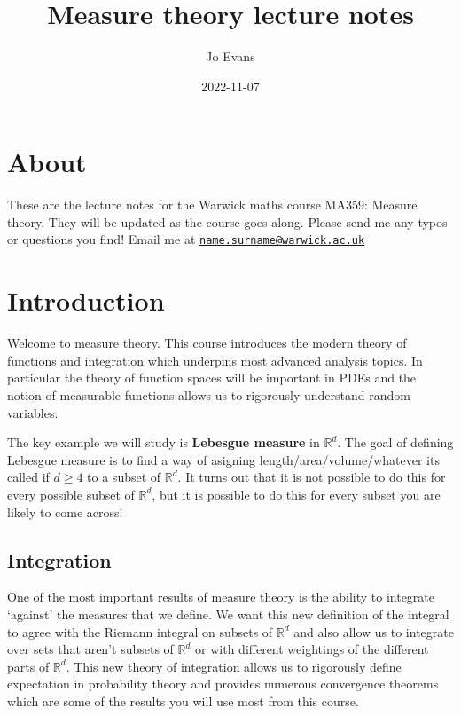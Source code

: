 \documentclass[
]{book}
\title{Measure theory lecture notes}
\author{Jo Evans}
\date{2022-11-07}
\theoremstyle{definition}
\theoremstyle{definition}
\theoremstyle{definition}
\theoremstyle{definition}
\theoremstyle{remark}
\begin{document}
\maketitle

{
\setcounter{tocdepth}{1}
\tableofcontents
}
\hypertarget{about}{%
\chapter*{About}\label{about}}

These are the lecture notes for the Warwick maths course MA359: Measure theory. They will be updated as the course goes along. Please send me any typos or questions you find! Email me at \href{mailto:name.surname@warwick.ac.uk}{\nolinkurl{name.surname@warwick.ac.uk}}

\hypertarget{introduction}{%
\chapter{Introduction}\label{introduction}}

Welcome to measure theory. This course introduces the modern theory of functions and integration which underpins most advanced analysis topics. In particular the theory of function spaces will be important in PDEs and the notion of measurable functions allows us to rigorously understand random variables.

The key example we will study is \textbf{Lebesgue measure} in \(\mathbb{R}^d\). The goal of defining Lebesgue measure is to find a way of asigning length/area/volume/whatever its called if \(d \geq 4\) to a subset of \(\mathbb{R}^d\). It turns out that it is not possible to do this for every possible subset of \(\mathbb{R}^d\), but it is possible to do this for every subset you are likely to come across!

\hypertarget{integration}{%
\section{Integration}\label{integration}}

One of the most important results of measure theory is the ability to integrate `against' the measures that we define. We want this new definition of the integral to agree with the Riemann integral on subsets of \(\mathbb{R}^d\) and also allow us to integrate over sets that aren't subsets of \(\mathbb{R}^d\) or with different weightings of the different parts of \(\mathbb{R}^d\). This new theory of integration allows us to rigorously define expectation in probability theory and provides numerous convergence theorems which are some of the results you will use most from this course.
\end{document}
